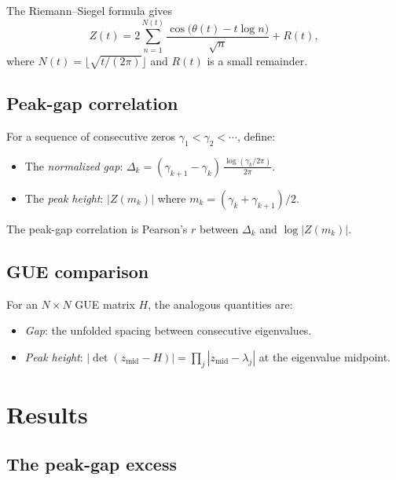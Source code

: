 \documentclass[11pt,a4paper]{article}
\begin{document}
The Riemann--Siegel formula gives
\begin{equation}\label{eq:RS}
Z(t) = 2\sum_{n=1}^{N(t)} \frac{\cos\bigl(\theta(t) - t\log n\bigr)}{\sqrt{n}} + R(t),
\end{equation}
where $N(t) = \lfloor\sqrt{t/(2\pi)}\rfloor$ and $R(t)$ is a small remainder.

\subsection{Peak-gap correlation}

For a sequence of consecutive zeros $\gamma_1 < \gamma_2 < \cdots$, define:
\begin{itemize}[nosep]
\item The \emph{normalized gap}: $\Delta_k = (\gamma_{k+1} - \gamma_k)\, \frac{\log(\gamma_k/2\pi)}{2\pi}$.
\item The \emph{peak height}: $|Z(m_k)|$ where $m_k = (\gamma_k + \gamma_{k+1})/2$.
\end{itemize}
The peak-gap correlation is Pearson's $r$ between $\Delta_k$ and $\log|Z(m_k)|$.

\subsection{GUE comparison}

For an $N \times N$ GUE matrix $H$, the analogous quantities are:
\begin{itemize}[nosep]
\item \emph{Gap}: the unfolded spacing between consecutive eigenvalues.
\item \emph{Peak height}: $|\det(z_{\mathrm{mid}} - H)| = \prod_j |z_{\mathrm{mid}} - \lambda_j|$ at the eigenvalue midpoint.
\end{itemize}

\section{Results}

\subsection{The peak-gap excess}
\end{document}
